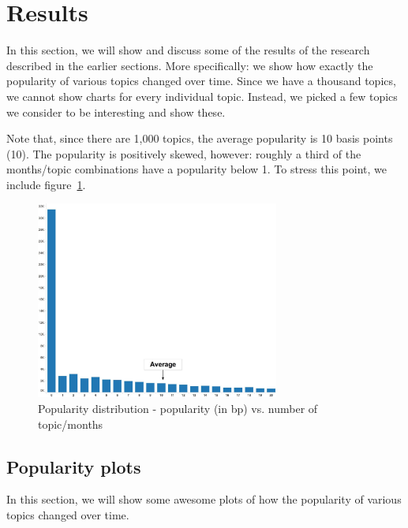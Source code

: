 \section{Results}
\label{sec:results}
In this section, we will show and discuss some of the results of the research described in the earlier sections. More specifically: we show how exactly the popularity of various topics changed over time. Since we have a thousand topics, we cannot show charts for every individual topic. Instead, we picked a few topics we consider to be interesting and show these. 


Note that, since there are 1,000 topics, the average popularity is 10 basis points (10\textpertenthousand). The popularity is positively skewed, however: roughly a third of the months/topic combinations have a popularity below 1\textpertenthousand. To stress this point, we include figure~\ref{fig:popularitydistribution}.

\begin{figure}[H]
	\caption{Popularity distribution - popularity (in bp) vs. number of topic/months}
	\label{fig:popularitydistribution}
	\centering
	\includegraphics[width=8cm]{popularity_distribution_basispoints_buckets}
\end{figure}

\subsection{Popularity plots}
In this section, we will show some awesome plots of how the popularity of various topics changed over time.

